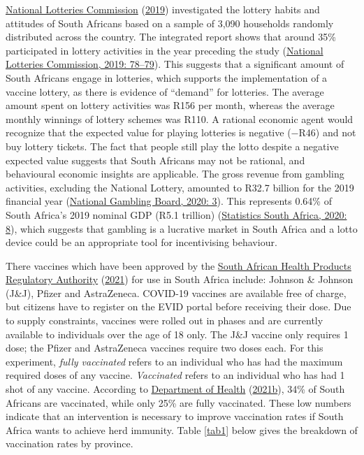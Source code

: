 \documentclass[11pt,preprint, authoryear]{elsarticle}
\numberwithin{equation}{section}
\numberwithin{figure}{section}
\numberwithin{table}{section}
\begin{document}
\protect\hyperlink{ref-lotto}{National Lotteries Commission}
(\protect\hyperlink{ref-lotto}{2019}) investigated the lottery habits
and attitudes of South Africans based on a sample of 3,090 households
randomly distributed across the country. The integrated report shows
that around 35\% participated in lottery activities in the year
preceding the study (\protect\hyperlink{ref-lotto}{National Lotteries
Commission, 2019: 78--79}). This suggests that a significant amount of
South Africans engage in lotteries, which supports the implementation of
a vaccine lottery, as there is evidence of ``demand'' for lotteries. The
average amount spent on lottery activities was R156 per month, whereas
the average monthly winnings of lottery schemes was R110. A rational
economic agent would recognize that the expected value for playing
lotteries is negative (\(-\)R46) and not buy lottery tickets. The fact
that people still play the lotto despite a negative expected value
suggests that South Africans may not be rational, and behavioural
economic insights are applicable. The gross revenue from gambling
activities, excluding the National Lottery, amounted to R32.7 billion
for the 2019 financial year (\protect\hyperlink{ref-gamble}{National
Gambling Board, 2020: 3}). This represents 0.64\% of South Africa's 2019
nominal GDP (R5.1 trillion) (\protect\hyperlink{ref-statsa}{Statistics
South Africa, 2020: 8}), which suggests that gambling is a lucrative
market in South Africa and a lotto device could be an appropriate tool
for incentivising behaviour.

There vaccines which have been approved by the
\protect\hyperlink{ref-sah}{South African Health Products Regulatory
Authority} (\protect\hyperlink{ref-sah}{2021}) for use in South Africa
include: Johnson \& Johnson (J\&J), Pfizer and AstraZeneca. COVID-19
vaccines are available free of charge, but citizens have to register on
the EVID portal before receiving their dose. Due to supply constraints,
vaccines were rolled out in phases and are currently available to
individuals over the age of 18 only. The J\&J vaccine only requires 1
dose; the Pfizer and AstraZeneca vaccines require two doses each. For
this experiment, \emph{fully vaccinated} refers to an individual who has
had the maximum required doses of any vaccine. \emph{Vaccinated} refers
to an individual who has had 1 shot of any vaccine. According to
\protect\hyperlink{ref-stat}{Department of Health}
(\protect\hyperlink{ref-stat}{2021b}), 34\% of South Africans are
vaccinated, while only 25\% are fully vaccinated. These low numbers
indicate that an intervention is necessary to improve vaccination rates
if South Africa wants to achieve herd immunity. Table \ref{tab1} below
gives the breakdown of vaccination rates by province.
\end{document}
